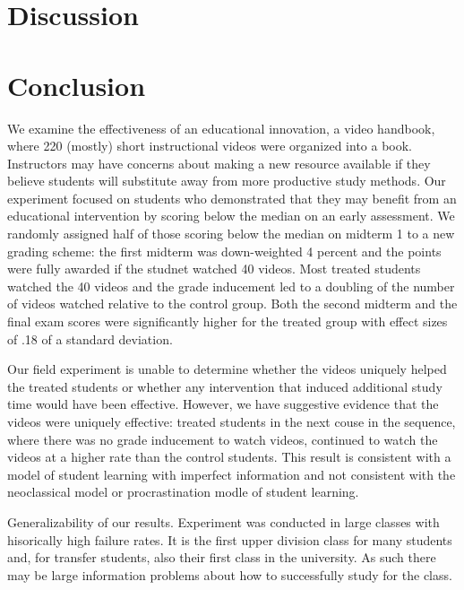 \documentclass[12pt]{article}
\begin{document}
\section{Discussion} \label{discussion}


\section{Conclusion} \label{conclusion}
 
We examine the effectiveness of an educational innovation, a video handbook, where 220 (mostly) short instructional videos were organized into a book.  Instructors may have concerns about making a new resource available if they believe students will substitute away from more productive study methods.  Our experiment focused on students who demonstrated that they may benefit from an educational intervention by scoring below the median on an early assessment.  We randomly assigned half of those scoring below the median on midterm 1 to a new grading scheme:  the first midterm was down-weighted 4 percent and the points were fully awarded if the studnet watched 40 videos.  Most treated students watched the 40 videos and the grade inducement led to a doubling of the number of videos watched relative to the control group.  Both the second midterm and the final exam scores were significantly higher for the treated group with effect sizes of .18 of a standard deviation.  

Our field experiment is unable to determine whether the videos uniquely helped the treated students or whether any intervention that induced additional study time would have been effective.  However, we have suggestive evidence that the videos were uniquely effective:  treated students in the next couse in the sequence, where there was no grade inducement to watch videos, continued to watch the videos at a higher rate than the control students.  This result is consistent with a model of student learning with imperfect information and not consistent with the neoclassical model or procrastination modle of student learning.

Generalizability of our results.  Experiment was conducted in large classes with hisorically high failure rates. It is the first upper division class for many students and, for transfer students, also their first class in the university.  As such there may be large information problems about how to successfully study for the class.  
\end{document}
